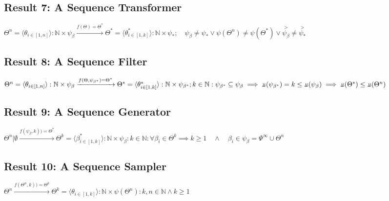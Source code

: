 \documentclass[a4paper, 18pt]{book} %
\newcommand{\invpi}{\rotatebox[origin=c]{180}{$\pi$}}
\begin{document}
\subsection{Result 7: A Sequence Transformer\cite{Lutalo2025transpsy}\cite{transformatics}}
\label{RES7}

$\Theta^n = \langle \theta_{i \in [1,n]} \rangle : \mathbb{N} \times \psi_\beta \xrightarrow{f(\Theta)=\Theta^*} \Theta^* = \langle \theta^*_{i \in [1,k]} \rangle: \mathbb{N} \times \psi_* 
; \quad \psi_\beta \neq \psi_{*} \lor \psi(\Theta^n) \neq \psi(\Theta^*) \lor \overset{>}{\psi_\beta} \neq \overset{>}{\psi_*}$

\subsection{Result 8: A Sequence Filter\cite{transformatics}}
\label{RES8}

$\Theta^n = \langle \theta_{i \in [1,n]} \rangle : \mathbb{N} \times \psi_\beta \xrightarrow{f(\Theta,\psi_{\beta^*})=\Theta^*} \Theta^* = \langle \theta^*_{i \in [1,k]} \rangle : \mathbb{N} \times \psi_{\beta^*} ;\\ k \in \mathbb{N} : \psi_{\beta^*} \subseteq \psi_\beta \implies \invpi(\psi_{\beta^*}) = k \leq \invpi(\psi_\beta) \implies \invpi(\Theta^*) \leq \invpi(\Theta^n) $

\subsection{Result 9: A Sequence Generator\cite{transformatics}\cite{lutalo2025transformatic}}
\label{RES9}

$\Theta^n | \emptyset \xrightarrow{f(\psi_\beta,k))=\Theta^*} \Theta^k = \langle \beta^*_{i \in [1,k]} \rangle : \mathbb{N} \times \psi_{\beta} : k \in \mathbb{N} : \forall \beta_i \in \Theta^k \implies  k \geq 1 \quad \land \quad \beta_i \in \psi_\beta = \Psi^\infty \cup \Theta^n$

\subsection{Result 10: A Sequence Sampler\cite{lutalo_2025_trans_genetics}}

$\Theta^n \xrightarrow{f(\Theta^n,k))=\Theta^k} \Theta^k = \langle \theta_{i \in [1,k]} \rangle : \mathbb{N} \times \psi(\Theta^n) : k,n \in \mathbb{N} \land k \geq 1$


\end{document}
